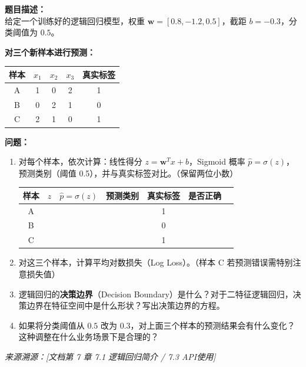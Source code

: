 \documentclass[a4paper,11pt]{ctexart}
\begin{document}
\begin{problembox}
    \textbf{题目描述：}\\
    给定一个训练好的逻辑回归模型，权重 $\boldsymbol{w} = [0.8, -1.2, 0.5]$，截距 $b = -0.3$，分类阈值为 $0.5$。

    \vspace{0.2cm}
    \textbf{对三个新样本进行预测：}

    \begin{center}
    \begin{tabular}{ccccc}
        \toprule
        样本 & $x_1$ & $x_2$ & $x_3$ & 真实标签 \\
        \midrule
        A & 1 & 0 & 2 & 1 \\
        B & 0 & 2 & 1 & 0 \\
        C & 2 & 1 & 0 & 1 \\
        \bottomrule
    \end{tabular}
    \end{center}

    \vspace{0.2cm}
    \textbf{问题：}
    \begin{enumerate}[(1)]
        \item 对每个样本，依次计算：线性得分 $z = \boldsymbol{w}^T x + b$，Sigmoid 概率 $\hat{p} = \sigma(z)$，预测类别（阈值 0.5），并与真实标签对比。（保留两位小数）

        \begin{center}
        \begin{tabular}{ccccccc}
            \toprule
            样本 & $z$ & $\hat{p}=\sigma(z)$ & 预测类别 & 真实标签 & 是否正确 \\
            \midrule
            A & \underline{\quad} & \underline{\quad} & \underline{\quad} & 1 & \underline{\quad} \\
            B & \underline{\quad} & \underline{\quad} & \underline{\quad} & 0 & \underline{\quad} \\
            C & \underline{\quad} & \underline{\quad} & \underline{\quad} & 1 & \underline{\quad} \\
            \bottomrule
        \end{tabular}
        \end{center}

        \item 对这三个样本，计算平均对数损失（Log Loss）。（样本 C 若预测错误需特别注意损失值）

        \item 逻辑回归的\textbf{决策边界}（Decision Boundary）是什么？对于二特征逻辑回归，决策边界在特征空间中是什么形状？写出决策边界的方程。

        \item 如果将分类阈值从 $0.5$ 改为 $0.3$，对上面三个样本的预测结果会有什么变化？这种调整在什么业务场景下是合理的？
    \end{enumerate}
    {\color{gray}\small\textit{来源溯源：[文档第 7 章 7.1 逻辑回归简介 / 7.3 API使用]}}
\end{problembox}
\end{document}
